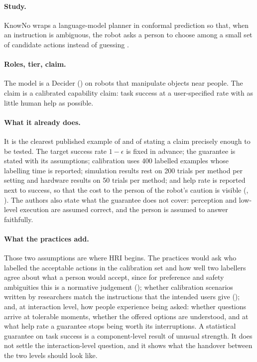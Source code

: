 \paragraph{Study.} KnowNo wraps a language-model planner in conformal
prediction so that, when an instruction is ambiguous, the robot asks a
person to choose among a small set of candidate actions instead of guessing
\cite{ren2023robots}.

\paragraph{Roles, tier, claim.} The model is a Decider () on robots
that manipulate objects near people. The claim is a calibrated capability
claim: task success at a user-specified rate with as little human help as
possible.

\paragraph{What it already does.} It is the clearest published example of
 and of stating a claim precisely enough to be tested. The
target success rate $1-\epsilon$ is fixed in advance; the guarantee is
stated with its assumptions; calibration uses 400 labelled examples whose
labelling time is reported; simulation results rest on 200 trials per method
per setting and hardware results on 50 trials per method; and help rate is
reported next to success, so that the cost to the person of the robot's
caution is visible (, ). The authors also
state what the guarantee does not cover: perception and low-level execution
are assumed correct, and the person is assumed to answer faithfully.

\paragraph{What the practices add.} Those two assumptions are where HRI
begins. The practices would ask who labelled the acceptable actions in the
calibration set and how well two labellers agree about what a person would
accept, since for preference and safety ambiguities this is a normative
judgement (); whether calibration scenarios written by
researchers match the instructions that the intended users give
(); and, at interaction level, how people experience being
asked: whether questions arrive at tolerable moments, whether the offered
options are understood, and at what help rate a guarantee stops being worth
its interruptions. A statistical guarantee on task success is a
component-level result of unusual strength. It does not settle the
interaction-level question, and it shows what the handover between the two
levels should look like.

